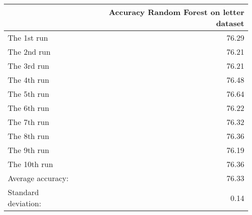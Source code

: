 \begin{tabular}{lr}
\toprule
{} &  Accuracy Random Forest on letter dataset \\
\midrule
The 1st run         &                                     76.29 \\
The 2nd run         &                                     76.21 \\
The 3rd run         &                                     76.21 \\
The 4th run         &                                     76.48 \\
The 5th run         &                                     76.64 \\
The 6th run         &                                     76.22 \\
The 7th run         &                                     76.32 \\
The 8th run         &                                     76.36 \\
The 9th run         &                                     76.19 \\
The 10th run        &                                     76.36 \\
Average accuracy:   &                                     76.33 \\
Standard deviation: &                                      0.14 \\
\bottomrule
\end{tabular}
